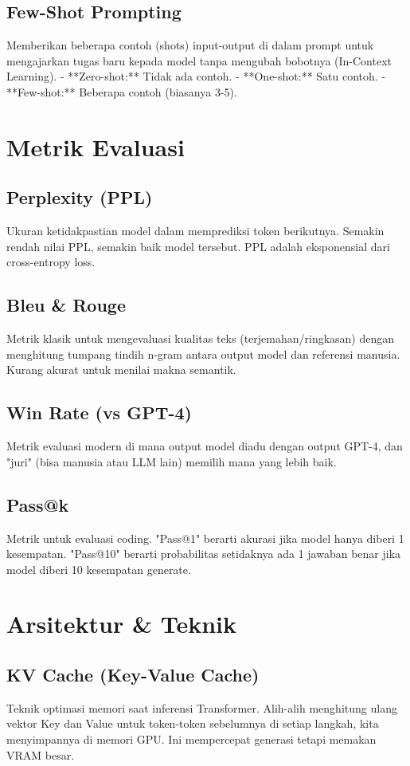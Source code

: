 \subsection{Few-Shot Prompting}
Memberikan beberapa contoh (shots) input-output di dalam prompt untuk mengajarkan tugas baru kepada model tanpa mengubah bobotnya (In-Context Learning).
- **Zero-shot:** Tidak ada contoh.
- **One-shot:** Satu contoh.
- **Few-shot:** Beberapa contoh (biasanya 3-5).

\section{Metrik Evaluasi}

\subsection{Perplexity (PPL)}
Ukuran ketidakpastian model dalam memprediksi token berikutnya. Semakin rendah nilai PPL, semakin baik model tersebut. PPL adalah eksponensial dari cross-entropy loss.

\subsection{Bleu \& Rouge}
Metrik klasik untuk mengevaluasi kualitas teks (terjemahan/ringkasan) dengan menghitung tumpang tindih n-gram antara output model dan referensi manusia. Kurang akurat untuk menilai makna semantik.

\subsection{Win Rate (vs GPT-4)}
Metrik evaluasi modern di mana output model diadu dengan output GPT-4, dan "juri" (bisa manusia atau LLM lain) memilih mana yang lebih baik.

\subsection{Pass@k}
Metrik untuk evaluasi coding. "Pass@1" berarti akurasi jika model hanya diberi 1 kesempatan. "Pass@10" berarti probabilitas setidaknya ada 1 jawaban benar jika model diberi 10 kesempatan generate.

\section{Arsitektur \& Teknik}

\subsection{KV Cache (Key-Value Cache)}
Teknik optimasi memori saat inferensi Transformer. Alih-alih menghitung ulang vektor Key dan Value untuk token-token sebelumnya di setiap langkah, kita menyimpannya di memori GPU. Ini mempercepat generasi tetapi memakan VRAM besar.

